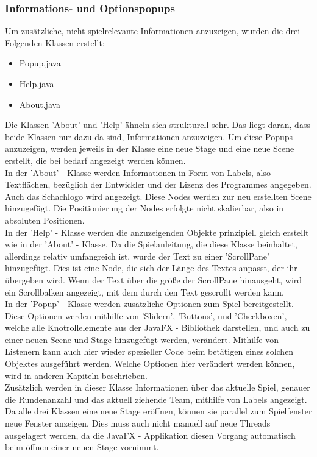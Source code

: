 \documentclass[12pt,a4paper]{article}
\begin{document}
{\subsubsection{Informations- und Optionspopups}
Um zusätzliche, nicht spielrelevante Informationen anzuzeigen, wurden die drei Folgenden Klassen erstellt: 
\begin{itemize}
\item{Popup.java}
\item{Help.java}
\item{About.java}
\end{itemize}
Die Klassen 'About' und 'Help' ähneln sich strukturell sehr. Das liegt daran, dass beide Klassen nur dazu da sind, Informationen anzuzeigen. Um diese Popups anzuzeigen, werden jeweils in der Klasse eine neue Stage und eine neue Scene erstellt, die bei bedarf angezeigt werden können. \\
In der 'About' - Klasse werden Informationen in Form von Labels, also Textflächen, bezüglich der Entwickler und der Lizenz des Programmes angegeben. Auch das Schachlogo wird angezeigt. Diese Nodes werden zur neu erstellten Scene hinzugefügt. Die Positionierung der Nodes erfolgte nicht skalierbar, also in absoluten Positionen.\\
In der 'Help' - Klasse werden die anzuzeigenden Objekte prinzipiell gleich erstellt wie in der 'About' - Klasse. Da die Spielanleitung, die diese Klasse beinhaltet, allerdings relativ umfangreich ist, wurde der Text zu einer 'ScrollPane' hinzugefügt. Dies ist eine Node, die sich der Länge des Textes anpasst, der ihr übergeben wird. Wenn der Text über die größe der ScrollPane hinausgeht, wird ein Scrollbalken angezeigt, mit dem durch den Text gescrollt werden kann. \\
In der 'Popup' - Klasse werden zusätzliche Optionen zum Spiel bereitgestellt. Diese Optionen werden mithilfe von 'Slidern', 'Buttons', und 'Checkboxen', welche alle Knotrollelemente aus der JavaFX - Bibliothek darstellen, und auch zu einer neuen Scene und Stage hinzugefügt werden, verändert. 
Mithilfe von Listenern kann auch hier wieder spezieller Code beim betätigen eines solchen Objektes ausgeführt werden. Welche Optionen hier verändert werden können, wird in anderen Kapiteln beschrieben.\\
Zusätzlich werden in dieser Klasse Informationen über das aktuelle Spiel, genauer die Rundenanzahl und das aktuell ziehende Team, mithilfe von Labels angezeigt. \\
Da alle drei Klassen eine neue Stage eröffnen, können sie parallel zum Spielfenster neue Fenster anzeigen. Dies muss auch nicht manuell auf neue Threads ausgelagert werden, da die JavaFX - Applikation diesen Vorgang automatisch beim öffnen einer neuen Stage vornimmt. 
}
\end{document}
